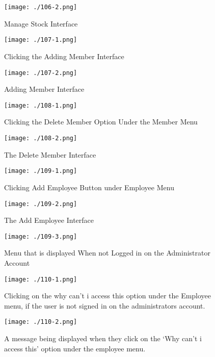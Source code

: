\begin{figure}[H]
    \texttt{[image: ./106-2.png]}
    \caption{Manage Stock Interface} \label{fig:106-2}
\end{figure}

\begin{figure}[H]
    \texttt{[image: ./107-1.png]}
    \caption{Clicking the Adding Member Interface} \label{fig:107-1}
\end{figure}

\begin{figure}[H]
    \texttt{[image: ./107-2.png]}
    \caption{Adding Member Interface} \label{fig:107-2}
\end{figure}

\begin{figure}[H]
    \texttt{[image: ./108-1.png]}
    \caption{Clicking the Delete Member Option Under the Member Menu} \label{fig:108-1}
\end{figure}

\begin{figure}[H]
    \texttt{[image: ./108-2.png]}
    \caption{The Delete Member Interface} \label{fig:108-2}
\end{figure}

\begin{figure}[H]
    \texttt{[image: ./109-1.png]}
    \caption{Clicking Add Employee Button under Employee Menu} \label{fig:109-1}
\end{figure}

\begin{figure}[H]
    \texttt{[image: ./109-2.png]}
    \caption{The Add Employee Interface} \label{fig:109-2}
\end{figure}

\begin{figure}[H]
    \texttt{[image: ./109-3.png]}
    \caption{Menu that is displayed When not Logged in on the Administrator Account} \label{fig:109-3}
\end{figure}

\begin{figure}[H]
    \texttt{[image: ./110-1.png]}
    \caption{Clicking on the why can't i access this option under the Employee menu, if the user is not signed in on the administrators account.} \label{fig:110-1}
\end{figure}

\begin{figure}[H]
    \texttt{[image: ./110-2.png]}
    \caption{A message being displayed when they click on the `Why can't i access this' option under the employee menu.} \label{fig:110-2}
\end{figure}

